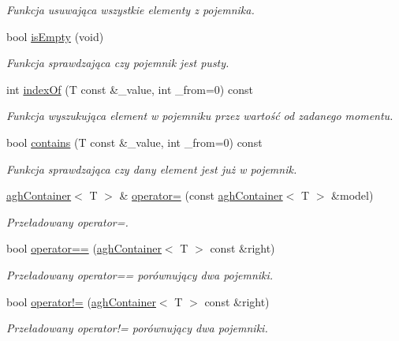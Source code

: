 \begin{DoxyCompactItemize}
\begin{DoxyCompactList}\small\item\em \-Funkcja usuwająca wszystkie elementy z pojemnika. \end{DoxyCompactList}\item 
bool \hyperlink{classaghContainer_a652375da8ec62f912ff50395c6cccd57}{is\-Empty} (void)
\begin{DoxyCompactList}\small\item\em \-Funkcja sprawdzająca czy pojemnik jest pusty. \end{DoxyCompactList}\item 
int \hyperlink{classaghContainer_ac8649b0e5573794b307b8bfea8c37f86}{index\-Of} (\-T const \&\-\_\-value, int \-\_\-from=0) const 
\begin{DoxyCompactList}\small\item\em \-Funkcja wyszukująca element w pojemniku przez wartość od zadanego momentu. \end{DoxyCompactList}\item 
bool \hyperlink{classaghContainer_ade0a867b0a2918819ed4adc8c996df36}{contains} (\-T const \&\-\_\-value, int \-\_\-from=0) const 
\begin{DoxyCompactList}\small\item\em \-Funkcja sprawdzająca czy dany element jest już w pojemnik. \end{DoxyCompactList}\item 
\hyperlink{classaghContainer}{agh\-Container}$<$ \-T $>$ \& \hyperlink{classaghContainer_a77d06ca6e51af5c2ed4f09c384221f7e}{operator=} (const \hyperlink{classaghContainer}{agh\-Container}$<$ \-T $>$ \&model)
\begin{DoxyCompactList}\small\item\em \-Przeładowany operator=. \end{DoxyCompactList}\item 
bool \hyperlink{classaghContainer_a32f2286a0713a0749ff0068843350b11}{operator==} (\hyperlink{classaghContainer}{agh\-Container}$<$ \-T $>$ const \&right)
\begin{DoxyCompactList}\small\item\em \-Przeładowany operator== porównujący dwa pojemniki. \end{DoxyCompactList}\item 
bool \hyperlink{classaghContainer_a578a7a46077986299eacfd270eadfec7}{operator!=} (\hyperlink{classaghContainer}{agh\-Container}$<$ \-T $>$ const \&right)
\begin{DoxyCompactList}\small\item\em \-Przeładowany operator!= porównujący dwa pojemniki. \end{DoxyCompactList}\item 

\end{DoxyCompactItemize}
